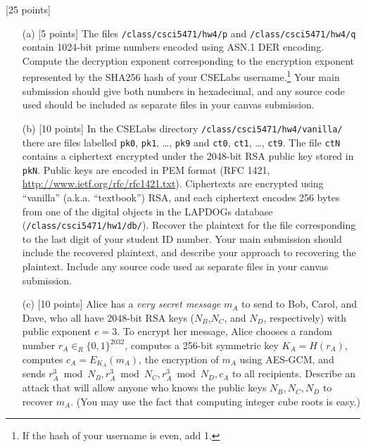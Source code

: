 \documentclass[11pt]{article}
\newcounter{qnum}
\newcommand{\question}[1]{\stepcounter{qnum}\bigskip\noindent{\bf \arabic{qnum}. #1.}}
\begin{document}
\question{RSA and factoring} [25 points] 
\begin{itemize}
\item[(a)] [5 points] The files \verb#/class/csci5471/hw4/p# and
  \verb#/class/csci5471/hw4/q# contain 1024-bit prime numbers encoded
  using ASN.1 DER encoding.   Compute the decryption exponent
  corresponding to the encryption exponent represented by the SHA256
  hash of your CSELabs username.\footnote{If the hash of your username
    is even, add 1.}  Your main submission should give both
  numbers in hexadecimal, and any source code used should be included
  as separate files in your canvas submission.

\item[(b)] [10 points] In the CSELabs directory
  \verb#/class/csci5471/hw4/vanilla/# there are files labelled
  \verb#pk0#, \verb#pk1#, \dots, \verb#pk9# and \verb#ct0#,
  \verb#ct1#, \dots, \verb#ct9#.   The file \verb#ctN# contains a
  ciphertext encrypted under the 2048-bit RSA public key stored in \verb#pkN#.
  Public keys are encoded in PEM format (RFC 1421,
  \url{http://www.ietf.org/rfc/rfc1421.txt}).   
  Ciphertexts are encrypted using ``vanilla'' (a.k.a. ``textbook'') RSA, and
  each ciphertext encodes 256 bytes from one of the digital objects in the
  LAPDOGs database  (\verb#/class/csci5471/hw1/db/#).  Recover the
  plaintext for the file corresponding to the last digit of your
  student ID number.  Your main submission should include the
  recovered plaintext, and describe your approach to recovering the
  plaintext.  Include any source code used as separate files in your
  canvas submission.

\item[(c)] [10 points] Alice has a {\em very secret message} $m_A$ to send
  to Bob, Carol, and Dave, who all have 2048-bit RSA keys
  ($N_B$,$N_C$, and $N_D$, respectively) with public
  exponent $e=3$.  To encrypt her message, Alice chooses a random
  number $r_A \in_R \{0,1\}^{2032}$, computes a 256-bit symmetric key $K_A =
  H(r_A)$, computes $c_A = E_{K_A}(m_A)$, the encryption of $m_A$
  using AES-GCM, and sends $r_A^3 \bmod N_B, r_A^3 \bmod N_C, r_A^3
  \bmod N_D, c_A$ to all recipients.  Describe an attack that will
  allow anyone who knows the public keys $N_B,N_C,N_D$ to recover
  $m_A$.   (You may use the fact that computing integer cube roots is easy.)


\end{itemize}
\end{document}

